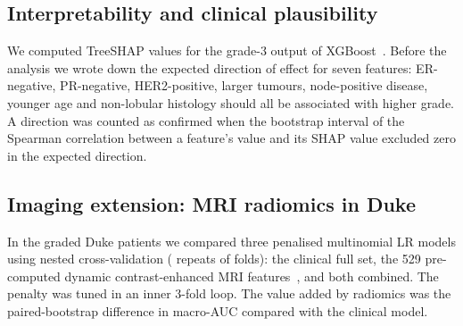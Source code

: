 \subsection{Interpretability and clinical plausibility}
We computed TreeSHAP values for the grade-3 output of XGBoost~\citep{lundberg2017shap,lundberg2020tree}.
Before the analysis we wrote down the expected direction of effect for seven features: ER-negative,
PR-negative, HER2-positive, larger tumours, node-positive disease, younger age and non-lobular
histology should all be associated with higher grade. A direction was counted as confirmed when the
bootstrap interval of the Spearman correlation between a feature's value and its SHAP value excluded
zero in the expected direction.

\subsection{Imaging extension: MRI radiomics in Duke}
In the graded Duke patients we compared three penalised multinomial LR models using nested
cross-validation (\Repeats{} repeats of \Folds{} folds): the clinical full set, the 529 pre-computed
dynamic contrast-enhanced MRI features~\citep{saha2018duke}, and both combined. The penalty was tuned
in an inner 3-fold loop. The value added by radiomics was the paired-bootstrap difference in
macro-AUC compared with the clinical model.

